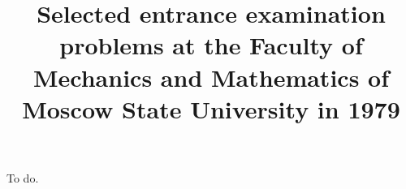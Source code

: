 \documentclass{article}
\title{Selected entrance examination problems at the Faculty of Mechanics and Mathematics of Moscow State University in 1979}
\author{}
\date{}
\begin{document}
\maketitle

\problem
To do.
\end{document}

